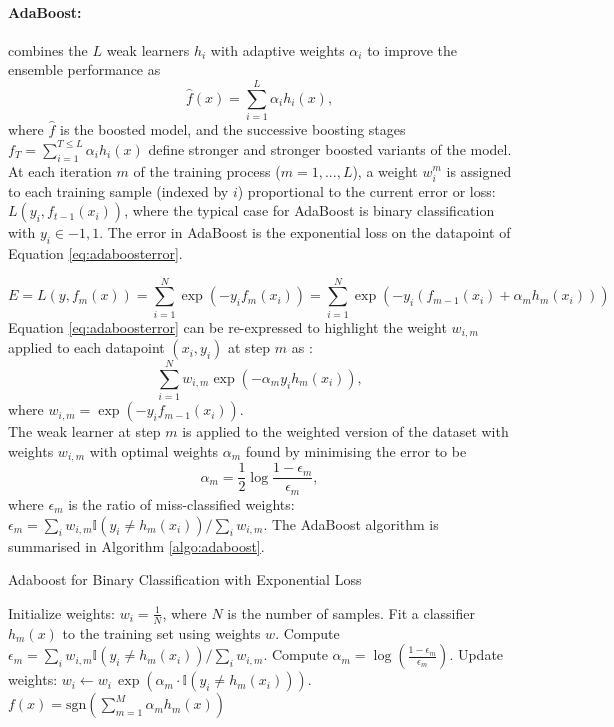 \paragraph{AdaBoost:} combines the $L$ weak learners $h_i$ with adaptive weights $\alpha_i$ to improve the ensemble performance as \[\hat{f}(x) = \sum_{i=1}^L \alpha_i h_i(x),\] where $\hat{f}$ is the boosted model, and the successive boosting stages $f_T = \sum_{i=1}^{T \leq L} \alpha_i h_i(x)$ define stronger and stronger boosted variants of the model. At each iteration $m$ of the training process ($m = 1, ..., L$), a weight $w_i^m$ is assigned to each training sample (indexed by $i$) proportional to the current error or loss: $L(y_i, f_{t-1}(x_i))$, where the typical case for AdaBoost is binary classification with $y_i \in {-1, 1}$. The error in AdaBoost is the exponential loss on the datapoint of Equation \ref{eq:adaboosterror}. 

\begin{equation}\label{eq:adaboosterror}
    E = L(y, f_m(x)) = \sum_{i=1}^N \exp\left(-y_i f_m(x_i)\right) = \sum_{i=1}^N \exp\left(-y_i (f_{m-1}(x_i) + \alpha_m h_m(x_i))\right)
\end{equation}
Equation \ref{eq:adaboosterror} can be re-expressed to highlight the weight $w_{i,m}$ applied to each datapoint $(x_i, y_i)$ at step $m$ as : \[\sum_{i=1}^N w_{i,m} \exp\left(-\alpha_m y_i h_m(x_i)\right),\] where $w_{i,m} = \exp\left(-y_i f_{m-1}(x_i)\right)$. \\
The weak learner at step $m$ is applied to the weighted version of the dataset with weights $w_{i,m}$ with optimal weights $\alpha_m$ found by minimising the error to be \[\alpha_m = \frac{1}{2} \log \frac{1 - \epsilon_m}{\epsilon_m},\] where $\epsilon_m$ is the ratio of miss-classified weights: $\epsilon_m = \sum_i w_{i,m} \mathbb{I}(y_i \neq h_m(x_i)) / \sum_i w_{i,m}$. The AdaBoost algorithm is summarised in Algorithm \ref{algo:adaboost}.

\begin{algorithm}
    \caption{Adaboost for Binary Classification with Exponential Loss \cite{MurphyML}}
    \label{algo:adaboost}
    \begin{algorithmic}
    \State Initialize weights: $w_i = \frac{1}{N}$, where $N$ is the number of samples.
        \State Fit a classifier $h_m(x)$ to the training set using weights $w$.
        \State Compute $\epsilon_m = \sum_i w_{i,m} \mathbb{I}(y_i \neq h_m(x_i)) / \sum_i w_{i,m}$.
        \State Compute $\alpha_m = \log\left(\frac{1 - \epsilon_m}{\epsilon_m}\right)$.
        \State Update weights: $w_i \leftarrow w_i \, \exp(\alpha_m \cdot \mathbb{I}(y_i \neq h_m(x_i)))$.
    \EndFor
    \State \Return $f(x) = \text{sgn}\left(\sum_{m=1}^M \alpha_m h_m(x)\right)$
    \end{algorithmic}
\end{algorithm}

